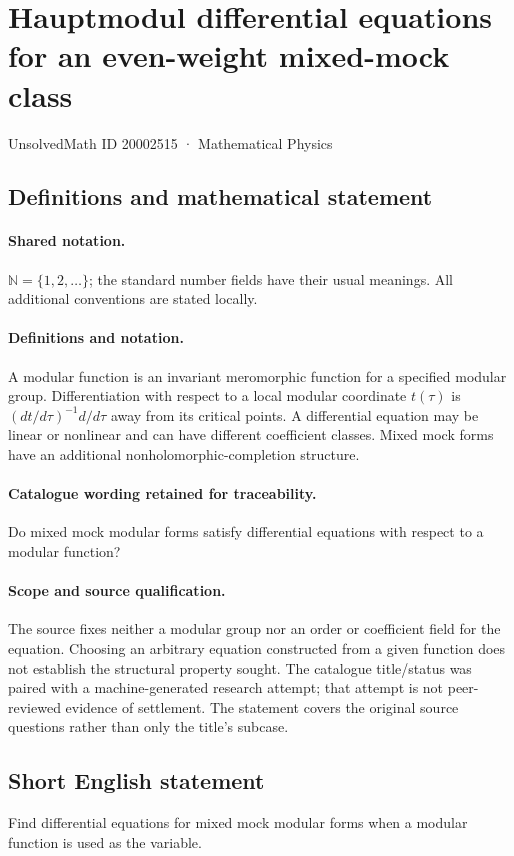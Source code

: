 \documentclass[11pt]{article}
\begin{document}
\setcounter{section}{20002514}
\section{Hauptmodul differential equations for an even-weight mixed-mock class}\label{20002515}
{\small UnsolvedMath ID 20002515 · Mathematical Physics}
\subsection{Definitions and mathematical statement}

\paragraph{Shared notation.}$\mathbb N=\{1,2,\ldots\}$; the standard number fields have their usual meanings. All additional conventions are stated locally.


\paragraph{Definitions and notation.}A modular function is an invariant meromorphic function for a specified modular group. Differentiation with respect to a local modular coordinate $t(\tau)$ is $(dt/d\tau)^{-1}d/d\tau$ away from its critical points. A differential equation may be linear or nonlinear and can have different coefficient classes. Mixed mock forms have an additional nonholomorphic-completion structure.

\paragraph{Catalogue wording retained for traceability.}
Do mixed mock modular forms satisfy differential equations with respect to a modular function?
\paragraph{Scope and source qualification.}The source fixes neither a modular group nor an order or coefficient field for the equation. Choosing an arbitrary equation constructed from a given function does not establish the structural property sought. The catalogue title/status was paired with a machine-generated research attempt; that attempt is not peer-reviewed evidence of settlement. The statement covers the original source questions rather than only the title’s subcase.
\subsection{Short English statement}
Find differential equations for mixed mock modular forms when a modular function is used as the variable.
\end{document}

